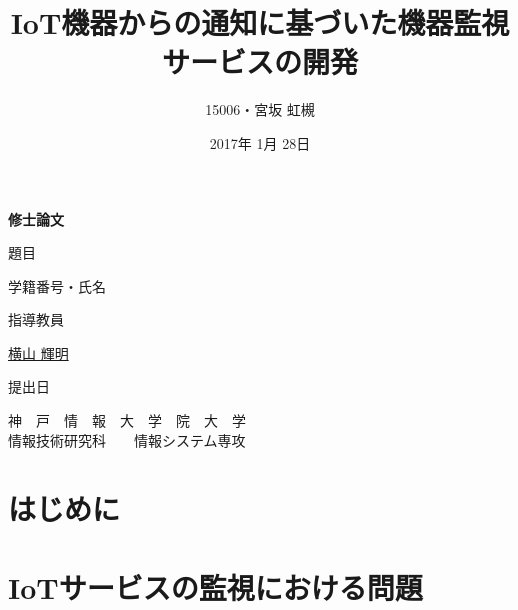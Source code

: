 \documentclass[a4paper]{jreport}
\begin{document}
\makeatletter
\renewcommand{\bibname}{参考文献}

\title{IoT機器からの通知に基づいた機器監視サービスの開発}
\author{15006・宮坂 虹槻}
\date{2017年 1月 28日}
\def\@teacher{横山 輝明}

\begin{titlepage}\begin{center}
{\Huge \textbf{修士論文} \par}
\vspace{1.5cm}
{\LARGE\gt 題目 \par}
{\LARGE\gt \underline{\@title} \par}
\vspace{2.5cm}
{\LARGE\gt 学籍番号・氏名 \par}
\vspace{1.5cm}
{\LARGE \underline{\@author} \par}
\vspace{1.5cm}
{\LARGE\gt 指導教員 \par}
\vspace{1.5cm}
{\LARGE\gt \underline{\@teacher} \par}
\vspace{1.5cm}
{\LARGE\gt 提出日 \par}
\vspace{1.5cm}
{\LARGE\gt \underline{\@date} \par}
\vspace{1.5cm}
{\Large\gt
神　戸　情　報　大　学　院　大　学\\
情報技術研究科　　情報システム専攻\\
\par}
\end{center}\end{titlepage}
\restoregeometry
\makeatother

\tableofcontents
\listoffigures
\listoftables

\begin{abstract}

\end{abstract}

\chapter{はじめに}

\chapter{IoTサービスの監視における問題}

\end{document}
